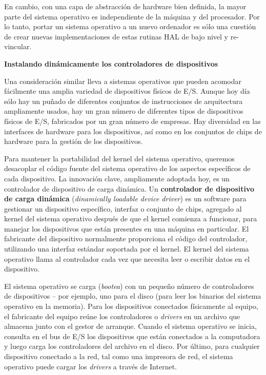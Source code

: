 \documentclass[10pt]{book}
\begin{document}
En cambio, con una capa de abstracción de hardware bien definida, la mayor parte del sistema operativo es independiente de la máquina y del procesador. Por lo tanto, portar un sistema operativo a un nuevo ordenador es sólo una cuestión de crear nuevas implementaciones de estas rutinas HAL de bajo nivel y re-vincular.

\textbf{Instalando dinámicamente los controladores de dispositivos}

Una consideración similar lleva a sistemas operativos que pueden acomodar fácilmente una amplia variedad de dispositivos físicos de E/S. Aunque hoy día sólo hay un puñado de diferentes conjuntos de instrucciones de arquitectura ampliamente usados, hay un gran número de diferentes tipos de dispositivos físicos de E/S, fabricados por un gran número de empresas. Hay diversidad en las interfaces de hardware para los dispositivos, así como en los conjuntos de chips de hardware para la gestión de los dispositivos.

Para mantener la portabilidad del kernel del sistema operativo, queremos desacoplar el código fuente del sistema operativo de los aspectos específicos de cada dispositivo. La innovación clave, ampliamente adoptada hoy, es un controlador de dispositivo de carga dinámica. Un \textbf{controlador de dispositivo de carga dinámica} (\textit{dinamically loadable device driver}) es un software para gestionar un dispositivo específico, interfaz o conjunto de chips, agregado al kernel del sistema operativo después de que el kernel comienza a funcionar, para manejar los dispositivos que están presentes en una máquina en particular. El fabricante del dispositivo normalmente proporciona el código del controlador, utilizando una interfaz estándar soportada por el kernel. El kernel del sistema operativo llama al controlador cada vez que necesita leer o escribir datos en el dispositivo.

El sistema operativo se carga (\textit{bootea}) con un pequeño número de controladores de dispositivos -- por ejemplo, uno para el disco (para leer los binarios del sistema operativo en la memoria). Para los dispositivos conectados físicamente al equipo, el fabricante del equipo reúne los controladores o \textit{drivers} en un archivo que almacena junto con el gestor de arranque. Cuando el sistema operativo se inicia, consulta en el bus de E/S los dispositivos que están conectados a la computadora y luego carga los controladores del archivo en el disco. Por último, para cualquier dispositivo conectado a la red, tal como una impresora de red, el sistema operativo puede cargar los \textit{drivers} a través de Internet.
\end{document}
